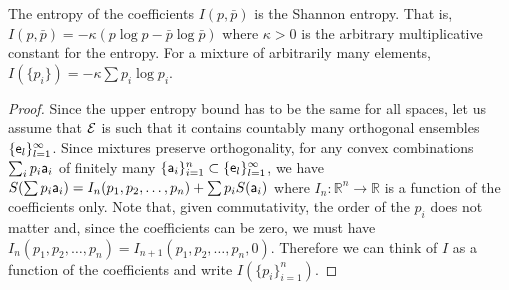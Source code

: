 \begin{thrm}\label{pm_es_entropyUnique}
	The entropy of the coefficients $I(p,\bar{p})$ is the Shannon entropy. That is, $I(p,\bar{p}) = - \kappa \left(p \log p - \bar{p} \log \bar{p}\right)$ where $\kappa>0$ is the arbitrary multiplicative constant for the entropy. For a mixture of arbitrarily many elements, $I(\{p_i\}) = - \kappa \sum p_i \log p_i$.
\end{thrm}

\begin{proof}
	Since the upper entropy bound has to be the same for all spaces, let us assume that $\Ens$ is such that it contains countably many orthogonal ensembles $\{\ens_l\}_{l=1}^{\infty}$. Since mixtures preserve orthogonality, for any convex combinations $\sum_i p_i \ens[a]_i$ of finitely many $\{\ens[a]_i\}_{i=1}^{n} \subset \{\ens_l\}_{l=1}^{\infty}$,  we have $S(\sum p_i \ens[a]_i ) = I_n(p_1, p_2, \dots, p_n) + \sum p_i S(\ens[a]_i)$ where $I_n : \mathbb{R}^n \to \mathbb{R}$ is a function of the coefficients only. Note that, given commutativity, the order of the $p_i$ does not matter and, since the coefficients can be zero, we must have $I_n(p_1, p_2, \dots, p_n) = I_{n+1}(p_1, p_2, \dots, p_n, 0)$. Therefore we can think of $I$ as a function of the coefficients and write $I(\{p_i\}_{i=1}^{n})$.
	

\end{proof}
